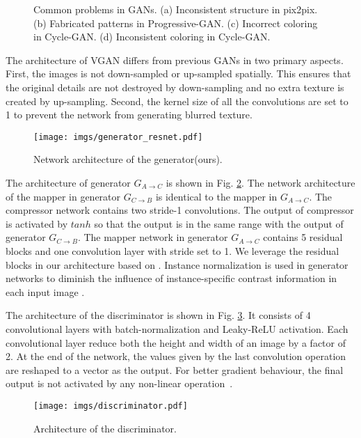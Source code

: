 \documentclass[10pt,conference,a4paper]{IEEEtran}
\begin{document}
\begin{figure}[!t]
    \centering
    \caption{Common problems in GANs.
    (a) Inconsistent structure in pix2pix. (b) Fabricated patterns in Progressive-GAN.
    (c) Incorrect coloring in Cycle-GAN. (d) Inconsistent coloring in Cycle-GAN.}
    \label{fig:inconsistent_gans}

\end{figure}

The architecture of VGAN differs from previous GANs in two primary aspects. First, the images is not down-sampled or up-sampled spatially. This ensures that the original details are not destroyed by down-sampling and no extra texture is created by up-sampling. Second, the kernel size of all the convolutions are set to 1 to prevent the network from generating blurred texture.

\begin{figure}[!t]
\centering
\texttt{[image: imgs/generator\_resnet.pdf]}
\caption{Network architecture of the generator(ours).}
\label{fig:gen_ours}
\end{figure}

The architecture of generator $G_{A\rightarrow C}$ is shown in Fig. \ref{fig:gen_ours}. The network architecture of the mapper in generator $G_{C\rightarrow B}$ is identical to the mapper in $G_{A\rightarrow C}$.
The compressor network contains two stride-1 convolutions. The output of compressor is activated by $tanh$ so that the output is in the same range with the output of generator $G_{C\rightarrow B}$. The mapper network in generator $G_{A\rightarrow C}$ contains 5 residual blocks and one convolution layer with stride set to 1. We leverage the residual blocks in our architecture based on \cite{resnet2015}. Instance normalization is used in generator networks to diminish the influence of instance-specific contrast information in each input image \cite{2016instancenorm}.

The architecture of the discriminator is shown in Fig. \ref{fig:disc}. It consists of 4 convolutional layers with batch-normalization and Leaky-ReLU activation. Each convolutional layer reduce both the height and width of an image by a factor of 2. At the end of the network, the values given by the last convolution operation are reshaped to a vector as the output. For better gradient behaviour, the final output is not activated by any non-linear operation~\cite{wgan}.
\begin{figure}[!t]
\centering
\texttt{[image: imgs/discriminator.pdf]}
\caption{Architecture of the discriminator.}
\label{fig:disc}
\end{figure}
\end{document}
